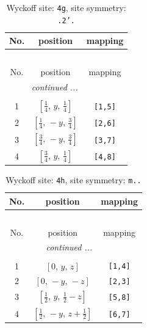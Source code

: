 \documentclass[fleqn,8pt]{jsarticle}
\begin{document}
\renewcommand{\arraystretch}{1.2}
\begin{longtable}{ccc}
\caption{Wyckoff site: {\tt 4g}, site symmetry: {\tt .2'.}}
 \\
 \hline \hline
No. & position & mapping \\ \hline \endfirsthead

\multicolumn{2}{l}{\tablename\ \thetable{}} \\
 \hline \hline
No. & position & mapping \\ \hline \endhead

 \hline \hline
\multicolumn{2}{r}{\footnotesize\it continued ...} \\ \endfoot

 \hline \hline
\multicolumn{2}{r}{} \\ \endlastfoot

1 & $\left[ \frac{1}{4},\, y,\, \frac{1}{4} \right]$ & {\tt [1,5]} \\ \hline
2 & $\left[ \frac{1}{4},\, - y,\, \frac{3}{4} \right]$ & {\tt [2,6]} \\ \hline
3 & $\left[ \frac{3}{4},\, - y,\, \frac{3}{4} \right]$ & {\tt [3,7]} \\ \hline
4 & $\left[ \frac{3}{4},\, y,\, \frac{1}{4} \right]$ & {\tt [4,8]} \\
\end{longtable}
\renewcommand{\arraystretch}{1.2}
\begin{longtable}{ccc}
\caption{Wyckoff site: {\tt 4h}, site symmetry: {\tt m..}}
 \\
 \hline \hline
No. & position & mapping \\ \hline \endfirsthead

\multicolumn{2}{l}{\tablename\ \thetable{}} \\
 \hline \hline
No. & position & mapping \\ \hline \endhead

 \hline \hline
\multicolumn{2}{r}{\footnotesize\it continued ...} \\ \endfoot

 \hline \hline
\multicolumn{2}{r}{} \\ \endlastfoot

1 & $\left[ 0,\, y,\, z \right]$ & {\tt [1,4]} \\ \hline
2 & $\left[ 0,\, - y,\, - z \right]$ & {\tt [2,3]} \\ \hline
3 & $\left[ \frac{1}{2},\, y,\, \frac{1}{2} - z \right]$ & {\tt [5,8]} \\ \hline
4 & $\left[ \frac{1}{2},\, - y,\, z + \frac{1}{2} \right]$ & {\tt [6,7]} \\
\end{longtable}
\end{document}
